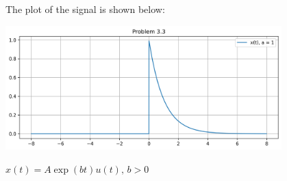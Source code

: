 \documentclass[a4paper, 10pt]{article}
\begin{document}
\begin{solution}
\newpage

The plot of the signal is shown below:
\begin{center}
    \includegraphics[width=0.8\textwidth]{images/problem_3_3.png}
\end{center}
\end{solution}

\newpage

\begin{subproblems}[start=4]
    \item \( x(t) = A\exp(bt)u(t), \, b > 0 \)
\end{subproblems}
\end{document}
